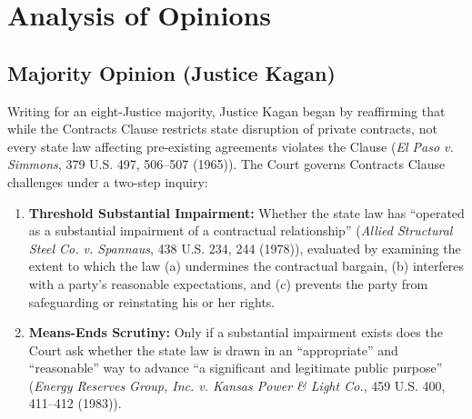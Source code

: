 \documentclass[12pt]{article}
\begin{document}
\section{Analysis of Opinions}
\subsection{Majority Opinion (Justice Kagan)}

Writing for an eight-Justice majority, Justice Kagan began by reaffirming that while the Contracts Clause restricts state disruption of private contracts, not every state law affecting pre-existing agreements violates the Clause (\textit{El Paso v. Simmons}, 379 U.S. 497, 506--507 (1965)). The Court governs Contracts Clause challenges under a two-step inquiry:
\begin{enumerate}
  \item \textbf{Threshold Substantial Impairment:} Whether the state law has ``operated as a substantial impairment of a contractual relationship'' (\textit{Allied Structural Steel Co. v. Spannaus}, 438 U.S. 234, 244 (1978)), evaluated by examining the extent to which the law (a) undermines the contractual bargain, (b) interferes with a party's reasonable expectations, and (c) prevents the party from safeguarding or reinstating his or her rights.
  \item \textbf{Means-Ends Scrutiny:} Only if a substantial impairment exists does the Court ask whether the state law is drawn in an ``appropriate'' and ``reasonable'' way to advance ``a significant and legitimate public purpose'' (\textit{Energy Reserves Group, Inc. v. Kansas Power \& Light Co.}, 459 U.S. 400, 411--412 (1983)).
\end{enumerate}
\end{document}
